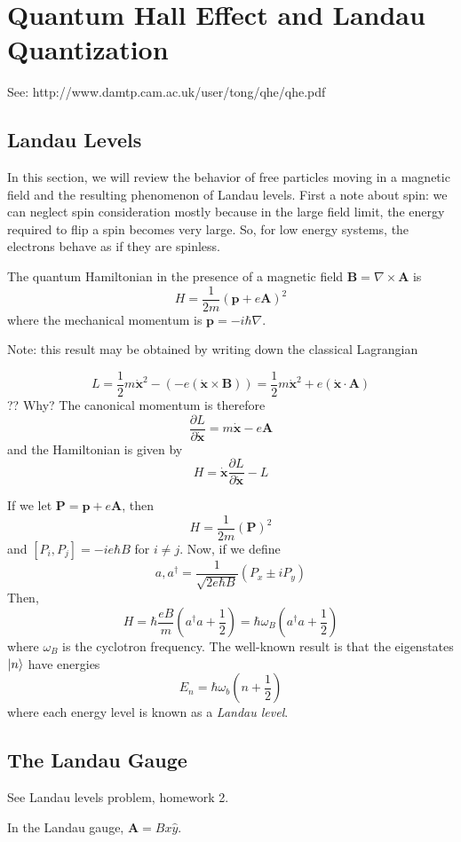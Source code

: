 \documentclass[10pt]{article}
\begin{document}
\section{Quantum Hall Effect and Landau Quantization}
See: http://www.damtp.cam.ac.uk/user/tong/qhe/qhe.pdf
\subsection{Landau Levels}
In this section, we will review the behavior of free particles moving in a magnetic field and the resulting phenomenon of
Landau levels. First a note about spin: we can neglect spin consideration mostly because in the large field limit, the energy required to flip a
spin becomes very large. So, for low energy systems, the electrons behave as if they are spinless.

The quantum Hamiltonian in the presence of a magnetic field $\textbf{B} = \nabla \times \textbf{A}$ is
$$
H = \frac{1}{2m}(\textbf{p} + e\textbf{A})^{2}
$$
where the mechanical momentum is $\textbf{p} = -i\hbar\nabla$.

Note: this result may be obtained by writing down the classical Lagrangian

$$ L = \frac{1}{2}m\dot{\textbf{x}}^{2} - (-e(\dot{\textbf{x}} \times \textbf{B})) = \frac{1}{2}m\dot{\textbf{x}}^{2} + e(\dot{\textbf{x}} \cdot \textbf{A})$$ ?? Why?
The canonical momentum is therefore
$$
\frac{\partial L}{\partial \dot{\textbf{x}}} = m\dot{\textbf{x}} - e\textbf{A}
$$
and the Hamiltonian is given by
$$
H = \dot{\textbf{x}}\frac{\partial L}{\partial \dot{\textbf{x}}} - L
$$

If we let $\textbf{P} = \textbf{p} + e\textbf{A}$, then
$$
H = \frac{1}{2m}(\textbf{P})^{2}
$$
and $[P_{i}, P_{j}] = -ie\hbar B$ for $i \neq j$. Now, if we define
$$
a, a^{\dagger} = \frac{1}{\sqrt{2e\hbar B}}(P_{x} \pm i P_{y})
$$
Then,
$$
H = \hbar \frac{eB}{m}\left (a^{\dagger}a + \frac{1}{2} \right) = \hbar \omega_{B}\left(a^{\dagger}a + \frac{1}{2}\right )
$$
where $\omega_{B}$ is the cyclotron frequency. The well-known result is that the eigenstates $\ket{n}$ have
energies
$$E_{n} = \hbar \omega_{b} \left(n + \frac{1}{2}\right)$$
where each energy level is known as a \emph{Landau level}.

\subsection{The Landau Gauge}
See Landau levels problem, homework 2.

In the Landau gauge, $\textbf{A} = Bx\hat{y}$.
\end{document}
